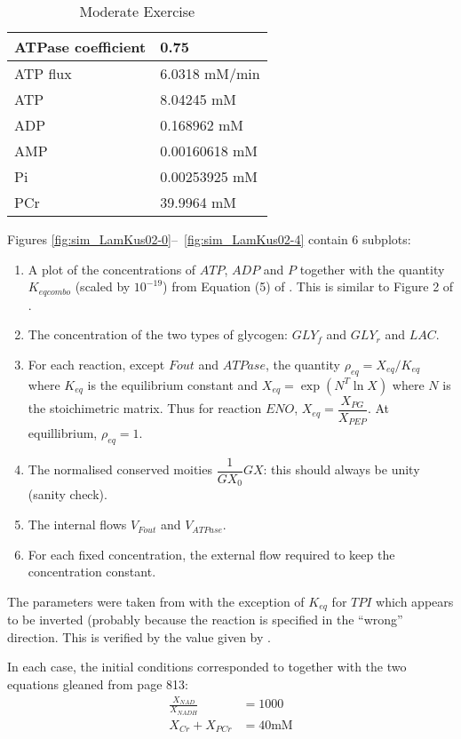 \message{ !name(LamKus02_report.tex)}\documentclass[12pt,a4paper]{article}
\begin{document}
\begin{table}[htbp]
  \centering
  \begin{tabular}{|l|l|}
    \hline
    ATPase coefficient & 0.75\\
    \hline
    ATP flux & 6.0318 mM/min\\
    ATP  & 8.04245 mM\\
    ADP  & 0.168962 mM \\
    AMP  & 0.00160618 mM \\
    Pi  & 0.00253925 mM \\
    PCr  & 39.9964 mM \\
    \hline
  \end{tabular}
  \caption{Moderate Exercise}
  \label{tab:ME}
\end{table}
Figures \ref{fig:sim_LamKus02-0}--~\ref{fig:sim_LamKus02-4} contain 6 subplots:
\begin{enumerate}
\item A plot of the concentrations of $ATP$, $ADP$ and $P$  together with
  the quantity $K_{eqcombo}$ (scaled by $10^{-19}$) from Equation (5)
  of \citet{LamKus02}. This is similar to Figure 2 of \citet{LamKus02}.
\item The concentration of the two types of glycogen: $GLY_f$ and
  $GLY_r$ and $LAC$.
\item For each reaction, except $Fout$ and $ATPase$, the quantity
  $\rho_{eq} = X_{eq}/K_{eq}$ where $K_{eq}$
  is the equilibrium constant and $X_{eq} = \exp(N^T \ln X)$ where $N$
  is the stoichimetric matrix. Thus for reaction $ENO$, $X_{eq} =
  \dfrac{X_{PG}}{X_{PEP}}$. At equillibrium, $\rho_{eq}=1$.
\item The normalised conserved moities $\dfrac{1}{GX_0}GX$: this
  should always be unity (sanity check).
\item The internal flows $V_{Fout}$ and $V_{ATPase}$.
\item For each fixed concentration, the external flow required to keep
  the concentration constant. 
\end{enumerate}

The parameters were taken from \citet[Table 3]{LamKus02} with the
exception of $K_{eq}$ for $TPI$ which appears to be inverted (probably
because the reaction is specified in the ``wrong'' direction. This is
verified by the value given by \citet[Table 9.1]{Bea12}.

In each case, the initial conditions corresponded to \citet[Table
3]{LamKus02} together with the two equations gleaned from page 813:
\begin{align}
  \frac{X_{NAD}}{X_{NADH}} &= 1000\\
  X_{Cr} + X_{PCr} &= 40\text{mM}
\end{align}
\end{document}

